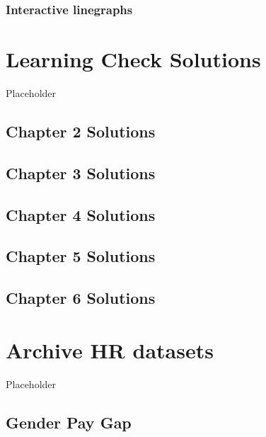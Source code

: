 \documentclass[
  12pt, krantz2,
]{krantz}
\begin{document}
\hypertarget{interactive-linegraphs}{%
\subsection{Interactive linegraphs}\label{interactive-linegraphs}}

\hypertarget{appendixD}{%
\chapter{Learning Check Solutions}\label{appendixD}}

Placeholder

\hypertarget{chapter-2-solutions}{%
\section{Chapter 2 Solutions}\label{chapter-2-solutions}}

\hypertarget{chapter-3-solutions}{%
\section{Chapter 3 Solutions}\label{chapter-3-solutions}}

\hypertarget{chapter-4-solutions}{%
\section{Chapter 4 Solutions}\label{chapter-4-solutions}}

\hypertarget{chapter-5-solutions}{%
\section{Chapter 5 Solutions}\label{chapter-5-solutions}}

\hypertarget{chapter-6-solutions}{%
\section{Chapter 6 Solutions}\label{chapter-6-solutions}}

\hypertarget{appendixE}{%
\chapter{Archive HR datasets}\label{appendixE}}

Placeholder

\hypertarget{gender_pay_gap}{%
\section{Gender Pay Gap}\label{gender_pay_gap}}
\end{document}
